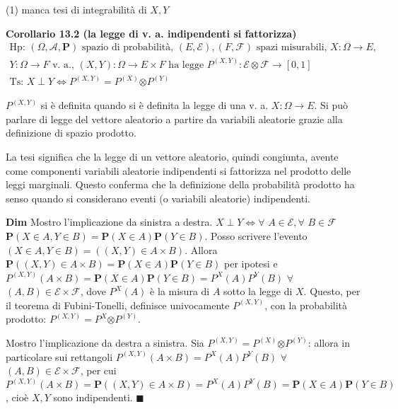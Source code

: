 \documentclass{article}
\begin{document}
(1) manca tesi di integrabilit\`{a} di $X,Y$


\textbf{Corollario 13.2 (la legge di v. a. indipendenti si fattorizza)}%
\begin{gather*}
\text{Hp}\text{: }\left( \Omega ,\mathcal{A},\mathbf{P}\right) \text{ spazio
di probabilit\`{a}, }\left( E,\mathcal{E}\right) ,\left( F,\mathcal{F}%
\right) \text{ spazi misurabili, }X:\Omega \rightarrow E\text{,} \\
Y:\Omega \rightarrow F\text{ v. a., }\left( X,Y\right) :\Omega \rightarrow
E\times F\text{ ha legge }P^{\left( X,Y\right) }:\mathcal{E\otimes F}%
\rightarrow \left[ 0,1\right] \\
\text{Ts}\text{: }X\perp Y\Longleftrightarrow P^{\left( X,Y\right)
}=P^{\left( X\right) }\mathcal{\otimes }P^{\left( Y\right) }
\end{gather*}

$P^{\left( X,Y\right) }$ si \`{e} definita quando si \`{e} definita la legge
di una v. a. $X:\Omega \rightarrow E$. Si pu\`{o} parlare di legge del
vettore aleatorio a partire da variabili aleatorie grazie alla definizione
di spazio prodotto.

La tesi significa che la legge di un vettore aleatorio, quindi congiunta,
avente come componenti variabili aleatorie indipendenti si fattorizza nel
prodotto delle leggi marginali. Questo conferma che la definizione della
probabilit\`{a} prodotto ha senso quando si considerano eventi (o variabili
aleatorie) indipendenti.

\textbf{Dim} Mostro l'implicazione da sinistra a destra. $X\perp
Y\Longleftrightarrow \forall $ $A\in \mathcal{E},\forall $ $B\in \mathcal{F}$
$\mathbf{P}\left( X\in A,Y\in B\right) =\mathbf{P}\left( X\in A\right) 
\mathbf{P}\left( Y\in B\right) $. Posso scrivere l'evento $\left( X\in
A,Y\in B\right) =\left( \left( X,Y\right) \in A\times B\right) $. Allora $%
\mathbf{P}\left( \left( X,Y\right) \in A\times B\right) =\mathbf{P}\left(
X\in A\right) \mathbf{P}\left( Y\in B\right) $ per ipotesi e $P^{\left(
X,Y\right) }\left( A\times B\right) =\mathbf{P}\left( X\in A\right) \mathbf{P%
}\left( Y\in B\right) =P^{X}\left( A\right) P^{Y}\left( B\right) $ $\forall $
$\left( A,B\right) \in \mathcal{E\times F}$, dove $P^{X}\left( A\right) $ 
\`{e} la misura di $A$ sotto la legge di $X$. Questo, per il teorema di
Fubini-Tonelli, definisce univocamente $P^{\left( X,Y\right) }$, con la
probabilit\`{a} prodotto: $P^{\left( X,Y\right) }=P^{X}\mathcal{\otimes }%
P^{\left( Y\right) }$.

Mostro l'implicazione da destra a sinistra. Sia $P^{\left( X,Y\right)
}=P^{\left( X\right) }\mathcal{\otimes }P^{\left( Y\right) }$: allora in
particolare sui rettangoli $P^{\left( X,Y\right) }\left( A\times B\right)
=P^{X}\left( A\right) P^{Y}\left( B\right) $ $\forall $ $\left( A,B\right)
\in \mathcal{E\times F}$, per cui $P^{\left( X,Y\right) }\left( A\times
B\right) =\mathbf{P}\left( \left( X,Y\right) \in A\times B\right)
=P^{X}\left( A\right) P^{Y}\left( B\right) =\mathbf{P}\left( X\in A\right) 
\mathbf{P}\left( Y\in B\right) $, cio\`{e} $X,Y$ sono indipendenti. $%
\blacksquare $
\end{document}
